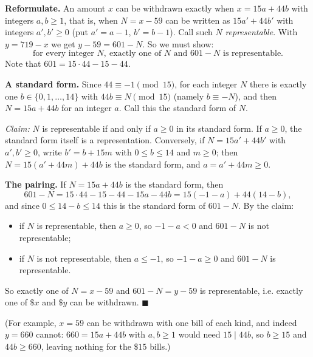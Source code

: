 \textbf{Reformulate.} An amount $x$ can be withdrawn exactly when $x=15a+44b$ with integers $a,b\ge1$, that is, when $N=x-59$ can be written as $15a'+44b'$ with integers $a',b'\ge0$ (put $a'=a-1$, $b'=b-1$). Call such $N$ \emph{representable}. With $y=719-x$ we get $y-59=601-N$. So we must show:
\[\text{for every integer }N,\ \text{exactly one of }N\text{ and }601-N\text{ is representable}.\]
Note that $601=15\cdot44-15-44$.

\textbf{A standard form.} Since $44\equiv-1\pmod{15}$, for each integer $N$ there is exactly one $b\in\{0,1,\dots,14\}$ with $44b\equiv N\pmod{15}$ (namely $b\equiv-N$), and then $N=15a+44b$ for an integer $a$. Call this the standard form of $N$.

\emph{Claim:} $N$ is representable if and only if $a\ge0$ in its standard form. If $a\ge0$, the standard form itself is a representation. Conversely, if $N=15a'+44b'$ with $a',b'\ge0$, write $b'=b+15m$ with $0\le b\le14$ and $m\ge0$; then $N=15(a'+44m)+44b$ is the standard form, and $a=a'+44m\ge0$.

\textbf{The pairing.} If $N=15a+44b$ is the standard form, then
\[601-N=15\cdot44-15-44-15a-44b=15(-1-a)+44(14-b),\]
and since $0\le14-b\le14$ this is the standard form of $601-N$. By the claim:
\begin{itemize}
\item if $N$ is representable, then $a\ge0$, so $-1-a<0$ and $601-N$ is not representable;
\item if $N$ is not representable, then $a\le-1$, so $-1-a\ge0$ and $601-N$ is representable.
\end{itemize}
So exactly one of $N=x-59$ and $601-N=y-59$ is representable, i.e. exactly one of $\$x$ and $\$y$ can be withdrawn. $\blacksquare$

(For example, $x=59$ can be withdrawn with one bill of each kind, and indeed $y=660$ cannot: $660=15a+44b$ with $a,b\ge1$ would need $15\mid44b$, so $b\ge15$ and $44b\ge660$, leaving nothing for the $\$15$ bills.)
